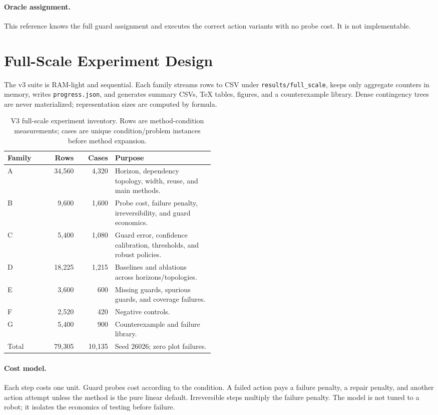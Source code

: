 \documentclass{article}
\begin{document}
\paragraph{Oracle assignment.}
This reference knows the full guard assignment and executes the correct action variants with no probe cost. It is not implementable.

\section{Full-Scale Experiment Design}
The v3 suite is RAM-light and sequential. Each family streams rows to CSV under \texttt{results/full\_scale}, keeps only aggregate counters in memory, writes \texttt{progress.json}, and generates summary CSVs, TeX tables, figures, and a counterexample library. Dense contingency trees are never materialized; representation sizes are computed by formula.

\begin{table}[t]
\centering
\caption{V3 full-scale experiment inventory. Rows are method-condition measurements; cases are unique condition/problem instances before method expansion.}
\label{tab:inventory}
\begin{tabular}{lrrp{0.48\linewidth}}
\toprule
Family & Rows & Cases & Purpose \\
\midrule
A & 34{,}560 & 4{,}320 & Horizon, dependency topology, width, reuse, and main methods.\\
B & 9{,}600 & 1{,}600 & Probe cost, failure penalty, irreversibility, and guard economics.\\
C & 5{,}400 & 1{,}080 & Guard error, confidence calibration, thresholds, and robust policies.\\
D & 18{,}225 & 1{,}215 & Baselines and ablations across horizons/topologies.\\
E & 3{,}600 & 600 & Missing guards, spurious guards, and coverage failures.\\
F & 2{,}520 & 420 & Negative controls.\\
G & 5{,}400 & 900 & Counterexample and failure library.\\
\midrule
Total & 79{,}305 & 10{,}135 & Seed 26026; zero plot failures.\\
\bottomrule
\end{tabular}
\end{table}

\paragraph{Cost model.}
Each step costs one unit. Guard probes cost according to the condition. A failed action pays a failure penalty, a repair penalty, and another action attempt unless the method is the pure linear default. Irreversible steps multiply the failure penalty. The model is not tuned to a robot; it isolates the economics of testing before failure.
\end{document}
